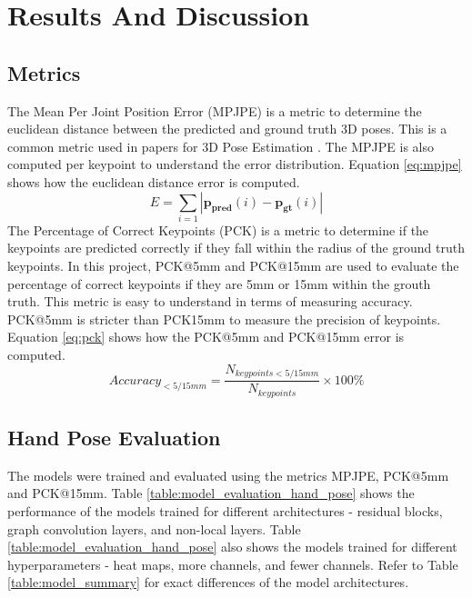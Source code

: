 \section{Results And Discussion}

\subsection{Metrics}
\noindent
The Mean Per Joint Position Error (MPJPE) is a metric to determine the euclidean distance between the predicted and ground truth 3D poses. This is a common metric used in papers for 3D Pose Estimation \cite{poseestimationreview}. The MPJPE is also computed per keypoint to understand the error distribution. Equation \ref{eq:mpjpe} shows how the euclidean distance error is computed.
\begin{equation}
E = \sum_{i=1} |\mathbf{p_{pred}} (i) - \mathbf{p_{gt}} (i)| \label{eq:mpjpe}
\end{equation}
\noindent
The Percentage of Correct Keypoints (PCK) is a metric to determine if the keypoints are predicted correctly if they fall within the radius of the ground truth keypoints. In this project, PCK@5mm and PCK@15mm are used to evaluate the percentage of correct keypoints if they are 5mm or 15mm within the grouth truth. This metric is easy to understand in terms of measuring accuracy. PCK@5mm is stricter than PCK15mm to measure the precision of keypoints. Equation \ref{eq:pck} shows how the PCK@5mm and PCK@15mm error is computed.
\begin{equation}
Accuracy_{<5/15mm} = \frac{N_{keypoints<5/15mm}}{N_{keypoints}} \times 100\% \label{eq:pck}
\end{equation}

\newpage
\subsection{Hand Pose Evaluation}
\noindent
The models were trained and evaluated using the metrics MPJPE, PCK@5mm and PCK@15mm. Table \ref{table:model_evaluation_hand_pose} shows the performance of the models trained for different architectures - residual blocks, graph convolution layers, and non-local layers. Table \ref{table:model_evaluation_hand_pose} also shows the models trained for different hyperparameters - heat maps, more channels, and fewer channels. Refer to Table \ref{table:model_summary} for exact differences of the model architectures.

